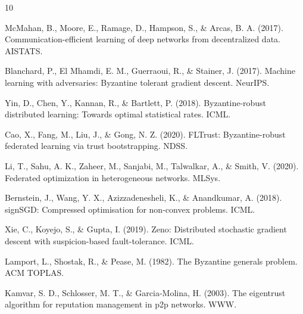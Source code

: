 \documentclass[conference]{IEEEtran}
\begin{document}
\begin{thebibliography}{10}

McMahan, B., Moore, E., Ramage, D., Hampson, S., \& Arcas, B. A. (2017). Communication-efficient learning of deep networks from decentralized data. AISTATS.

Blanchard, P., El Mhamdi, E. M., Guerraoui, R., \& Stainer, J. (2017). Machine learning with adversaries: Byzantine tolerant gradient descent. NeurIPS.

Yin, D., Chen, Y., Kannan, R., \& Bartlett, P. (2018). Byzantine-robust distributed learning: Towards optimal statistical rates. ICML.

Cao, X., Fang, M., Liu, J., \& Gong, N. Z. (2020). FLTrust: Byzantine-robust federated learning via trust bootstrapping. NDSS.

Li, T., Sahu, A. K., Zaheer, M., Sanjabi, M., Talwalkar, A., \& Smith, V. (2020). Federated optimization in heterogeneous networks. MLSys.

Bernstein, J., Wang, Y. X., Azizzadenesheli, K., \& Anandkumar, A. (2018). signSGD: Compressed optimisation for non-convex problems. ICML.

Xie, C., Koyejo, S., \& Gupta, I. (2019). Zeno: Distributed stochastic gradient descent with suspicion-based fault-tolerance. ICML.

Lamport, L., Shostak, R., \& Pease, M. (1982). The Byzantine generals problem. ACM TOPLAS.

Kamvar, S. D., Schlosser, M. T., \& Garcia-Molina, H. (2003). The eigentrust algorithm for reputation management in p2p networks. WWW.

\end{thebibliography}
\end{document}
